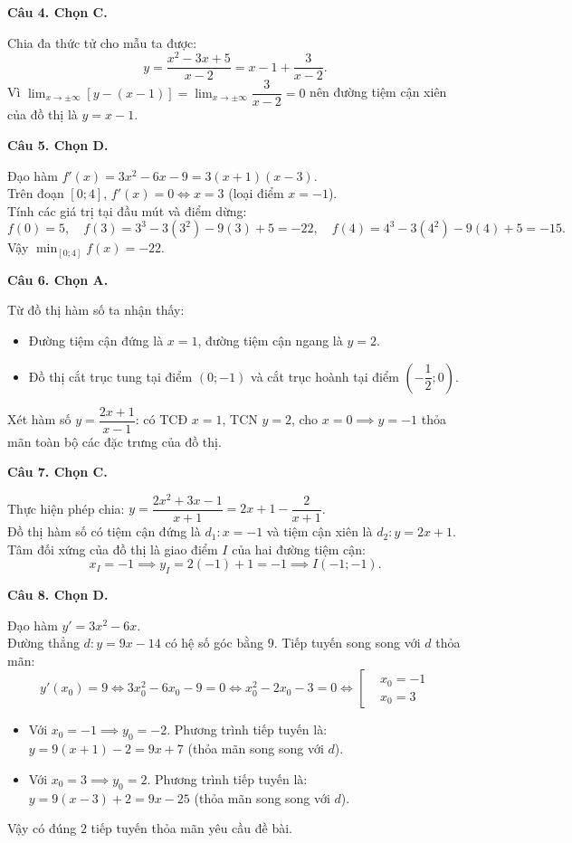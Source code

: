 \documentclass[12pt,a4paper]{article}
\newcommand{\loigiai}[1]{\par\medskip\Needspace{4\baselineskip}\noindent\textbf{#1}\par\nobreak}
\begin{document}
\loigiai{Câu 4. Chọn C.}
Chia đa thức tử cho mẫu ta được:
\[y = \dfrac{x^2 - 3x + 5}{x - 2} = x - 1 + \dfrac{3}{x - 2}.\]
Vì $\displaystyle\lim_{x \to \pm\infty} [y - (x - 1)] = \lim_{x \to \pm\infty} \dfrac{3}{x - 2} = 0$ nên đường tiệm cận xiên của đồ thị là $y = x - 1$.

\loigiai{Câu 5. Chọn D.}
Đạo hàm $f'(x) = 3x^2 - 6x - 9 = 3(x + 1)(x - 3)$.\\
Trên đoạn $[0; 4]$, $f'(x) = 0 \iff x = 3$ (loại điểm $x = -1$).\\
Tính các giá trị tại đầu mút và điểm dừng:
\[f(0) = 5,\quad f(3) = 3^3 - 3(3^2) - 9(3) + 5 = -22,\quad f(4) = 4^3 - 3(4^2) - 9(4) + 5 = -15.\]
Vậy $\displaystyle\min_{[0; 4]} f(x) = -22$.

\loigiai{Câu 6. Chọn A.}
Từ đồ thị hàm số ta nhận thấy:
\begin{itemize}
\item Đường tiệm cận đứng là $x = 1$, đường tiệm cận ngang là $y = 2$.
\item Đồ thị cắt trục tung tại điểm $(0; -1)$ và cắt trục hoành tại điểm $\left(-\dfrac{1}{2}; 0\right)$.
\end{itemize}
Xét hàm số $y = \dfrac{2x+1}{x-1}$: có TCĐ $x = 1$, TCN $y = 2$, cho $x = 0 \implies y = -1$ thỏa mãn toàn bộ các đặc trưng của đồ thị.

\loigiai{Câu 7. Chọn C.}
Thực hiện phép chia: $y = \dfrac{2x^2 + 3x - 1}{x + 1} = 2x + 1 - \dfrac{2}{x + 1}$.\\
Đồ thị hàm số có tiệm cận đứng là $d_1: x = -1$ và tiệm cận xiên là $d_2: y = 2x + 1$.\\
Tâm đối xứng của đồ thị là giao điểm $I$ của hai đường tiệm cận:
\[x_I = -1 \implies y_I = 2(-1) + 1 = -1 \implies I(-1; -1).\]

\loigiai{Câu 8. Chọn D.}
Đạo hàm $y' = 3x^2 - 6x$.\\
Đường thẳng $d: y = 9x - 14$ có hệ số góc bằng $9$. Tiếp tuyến song song với $d$ thỏa mãn:
\[y'(x_0) = 9 \iff 3x_0^2 - 6x_0 - 9 = 0 \iff x_0^2 - 2x_0 - 3 = 0 \iff \left[\begin{aligned}&x_0 = -1\\&x_0 = 3\end{aligned}\right.\]
\begin{itemize}
\item Với $x_0 = -1 \implies y_0 = -2$. Phương trình tiếp tuyến là: $y = 9(x + 1) - 2 = 9x + 7$ (thỏa mãn song song với $d$).
\item Với $x_0 = 3 \implies y_0 = 2$. Phương trình tiếp tuyến là: $y = 9(x - 3) + 2 = 9x - 25$ (thỏa mãn song song với $d$).
\end{itemize}
Vậy có đúng $2$ tiếp tuyến thỏa mãn yêu cầu đề bài.
\end{document}
